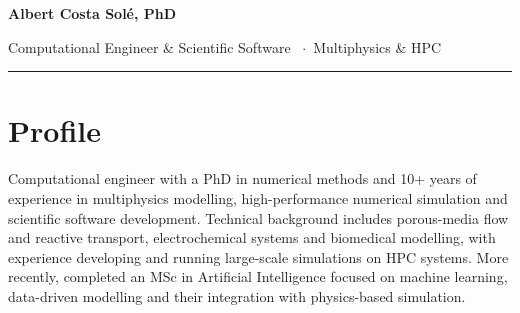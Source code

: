 \documentclass[10pt,a4paper]{article}
\begin{document}
\fontsize{10.6}{13.4}\selectfont

\begin{minipage}[b]{0.52\textwidth}
  {\sffamily\fontsize{21}{22}\selectfont\bfseries\color{ink}Albert Costa Solé, PhD}
\end{minipage}\hfill
\begin{minipage}[b]{0.46\textwidth}
\end{minipage}

\vspace{3.0pt}
{\sffamily\fontsize{8.6}{10.5}\selectfont\color{accent}\lsstyle
	Computational Engineer \& Scientific Software
	\ \textcolor{hair}{$\cdot$}\  Multiphysics \& HPC}\\[3.0pt]
{\color{accent}\rule{\textwidth}{1.2pt}}
\section{Profile}
Computational engineer with a PhD in numerical methods and 10+ years of experience in multiphysics modelling, high-performance numerical simulation and scientific software development. Technical background includes porous-media flow and reactive transport, electrochemical systems and biomedical modelling, with experience developing and running large-scale simulations on HPC systems. More recently, completed an MSc in Artificial Intelligence focused on machine learning, data-driven modelling and their integration with physics-based simulation.
\end{document}
